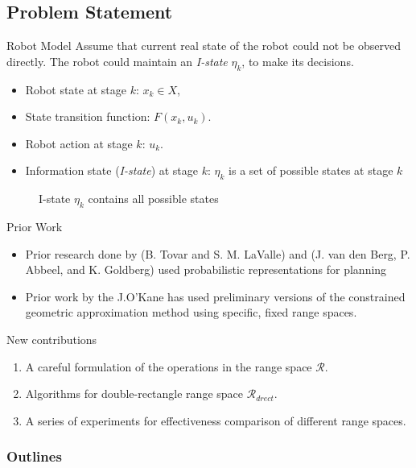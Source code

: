 \documentclass[10pt]{beamer}
\begin{document}
\subsection[Problem]{Problem Statement}
\begin{frame}{Robot Model}
Assume that current real state of the robot could not be observed directly.  The
robot could maintain an \emph{I-state} $\eta_k$, to make its decisions.
\begin{itemize}
\item Robot state at stage $k$: $x_k \in X$,
\item State transition function: $F(x_k, u_k)$.
\item Robot action at stage $k$: $u_k$.
\item Information state (\emph{I-state}) at stage $k$: $\eta_k$ is a set of
  possible states at stage $k$
\end{itemize}
\begin{figure}
  \caption{I-state $\eta_k$ contains all possible states}
  \label{fig:istate}
\end{figure}
\end{frame}

\begin{frame}{Prior Work}
\begin{itemize}
\item Prior research done by (B. Tovar and S. M. LaValle) and (J. van den Berg,
  P. Abbeel, and K. Goldberg)
  used probabilistic representations for planning\\

\item Prior work by the J.O'Kane has used preliminary versions of the
  constrained geometric approximation method using specific, fixed range spaces.
\end{itemize}
New contributions
\begin{enumerate}
\item A careful formulation of the operations in the range space $\mathcal{R}$.
\item Algorithms for double-rectangle range space $\mathcal{R}_{drect}$.
\item A series of experiments for effectiveness comparison of different range spaces.
\end{enumerate}
\end{frame}
\begin{frame}
  \frametitle{Outlines}
  \tableofcontents[]
\end{frame}
\end{document}
